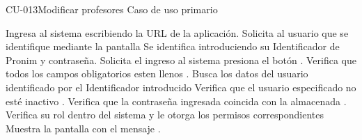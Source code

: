 \begin{UseCase}{CU-013}{Modificar profesores}
{		%
		Caso de uso primario
	}
\end{UseCase}

\begin{UCtrayectoria}
	
	\UCpaso[\UCactor] Ingresa al sistema escribiendo la URL de la aplicación.
	\UCpaso Solicita al usuario que se identifique mediante la pantalla 
	\UCpaso[\UCactor] \label{UC1.Datos} Se identifica introduciendo su Identificador de Pronim y contraseña.
	\UCpaso[\UCactor] Solicita el ingreso al sistema presiona el botón .
    \UCpaso Verifica que todos los campos obligatorios esten llenos .
	\UCpaso Busca los datos del usuario identificado por el Identificador introducido 
	\UCpaso Verifica que el usuario especificado no esté inactivo .
	\UCpaso Verifica que la contraseña ingresada coincida con la almacenada .\label{UC1.Contrasenia}
	\UCpaso Verifica su rol dentro del sistema y le otorga los permisos correspondientes
	\UCpaso Muestra la pantalla  con el mensaje .
\end{UCtrayectoria}


